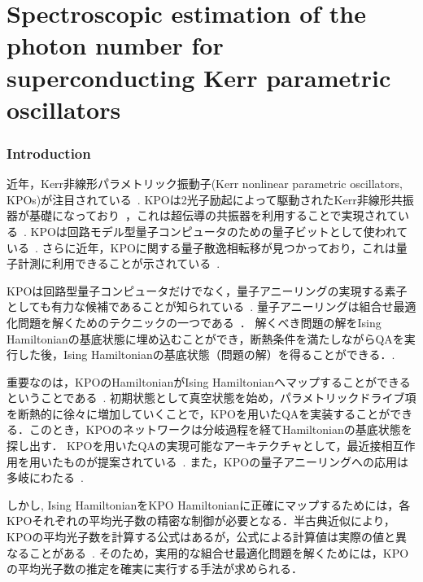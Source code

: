 \part{Spectroscopic estimation of the photon number for superconducting Kerr parametric oscillators
}\section{Introduction}
近年，Kerr非線形パラメトリック振動子(Kerr nonlinear parametric oscillators,  KPOs)が注目されている~\cite{goto2016bifurcation,goto2019quantum,goto2019demand,wang2019quantum,grimm2020stabilization,yamaji2022spectroscopic}.
KPOは2光子励起によって駆動されたKerr非線形共振器が基礎になっており~\cite{PhysRevA.44.4704,PhysRevA.48.2494}，これは超伝導の共振器を利用することで実現されている~\cite{bourassa2012josephson,meaney2014quantum,leghtas2015confining}.
KPOは回路モデル型量子コンピュータのための量子ビットとして使われている~\cite{cochrane1999macroscopically,goto2016universal,puri2017engineering,puri2020bias}.
さらに近年，KPOに関する量子散逸相転移が見つかっており，これは量子計測に利用できることが示されている~\cite{bartolo2016exact,minganti2018spectral,dykman2018interaction,rota2019quantum}. 

KPOは回路型量子コンピュータだけでなく，量子アニーリングの実現する素子としても有力な候補であることが知られている~\cite{goto2016bifurcation,puri2017quantum}.
量子アニーリングは組合せ最適化問題を解くためのテクニックの一つである~\cite{kadowaki1998quantum,farhi2001quantum}．
解くべき問題の解をIsing Hamiltonianの基底状態に埋め込むことができ，断熱条件を満たしながらQAを実行した後，Ising Hamiltonianの基底状態（問題の解）を得ることができる．\cite{morita2008mathematical}. 

重要なのは，KPOのHamiltonianがIsing Hamiltonianへマップすることができるということである~\cite{goto2016bifurcation,puri2017quantum}.
初期状態として真空状態を始め，パラメトリックドライブ項を断熱的に徐々に増加していくことで，KPOを用いたQAを実装することができる．このとき，KPOのネットワークは分岐過程を経てHamiltonianの基底状態を探し出す．
KPOを用いたQAの実現可能なアーキテクチャとして，最近接相互作用を用いたものが提案されている~\cite{lechner2015quantum,puri2017quantum}.
また，KPOの量子アニーリングへの応用は多岐にわたる~\cite{nigg2017robust,onodera2020quantum,2020CmPhy...3..235G}.

しかし, Ising HamiltonianをKPO Hamiltonianに正確にマップするためには，各KPOそれぞれの平均光子数の精密な制御が必要となる．半古典近似により，KPOの平均光子数を計算する公式はあるが，公式による計算値は実際の値と異なることがある~\cite{kanao2021high}.
そのため，実用的な組合せ最適化問題を解くためには，KPOの平均光子数の推定を確実に実行する手法が求められる．

